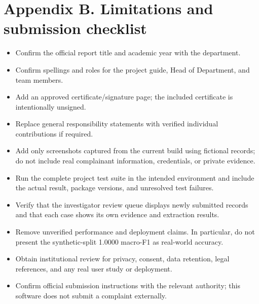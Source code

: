 \documentclass[12pt,a4paper,oneside]{report}
\begin{document}
\clearpage\chapter{Appendix B. Limitations and submission checklist}
\begin{itemize}
\item Confirm the official report title and academic year with the department.
\item Confirm spellings and roles for the project guide, Head of Department, and team members.
\item Add an approved certificate/signature page; the included certificate is intentionally unsigned.
\item Replace general responsibility statements with verified individual contributions if required.
\item Add only screenshots captured from the current build using fictional records; do not include real complainant information, credentials, or private evidence.
\item Run the complete project test suite in the intended environment and include the actual result, package versions, and unresolved test failures.
\item Verify that the investigator review queue displays newly submitted records and that each case shows its own evidence and extraction results.
\item Remove unverified performance and deployment claims. In particular, do not present the synthetic-split 1.0000 macro-F1 as real-world accuracy.
\item Obtain institutional review for privacy, consent, data retention, legal references, and any real user study or deployment.
\item Confirm official submission instructions with the relevant authority; this software does not submit a complaint externally.
\end{itemize}
\end{document}
